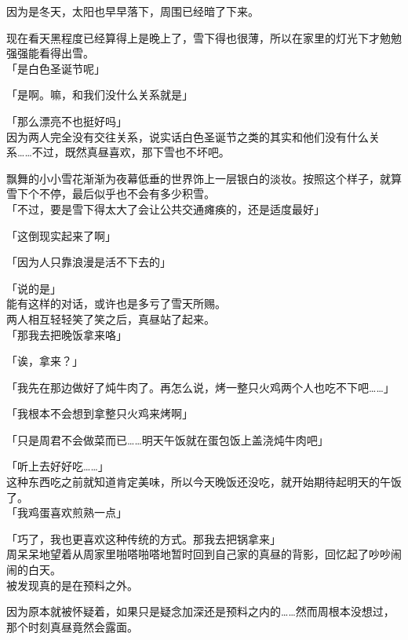 因为是冬天，太阳也早早落下，周围已经暗了下来。

现在看天黑程度已经算得上是晚上了，雪下得也很薄，所以在家里的灯光下才勉勉强强能看得出雪。\\

「是白色圣诞节呢」

「是啊。嘛，和我们没什么关系就是」

「那么漂亮不也挺好吗」\\

因为两人完全没有交往关系，说实话白色圣诞节之类的其实和他们没有什么关系……不过，既然真昼喜欢，那下雪也不坏吧。

飘舞的小小雪花渐渐为夜幕低垂的世界饰上一层银白的淡妆。按照这个样子，就算雪下个不停，最后似乎也不会有多少积雪。\\

「不过，要是雪下得太大了会让公共交通瘫痪的，还是适度最好」

「这倒现实起来了啊」

「因为人只靠浪漫是活不下去的」

「说的是」\\

能有这样的对话，或许也是多亏了雪天所赐。\\

两人相互轻轻笑了笑之后，真昼站了起来。\\

「那我去把晚饭拿来咯」

「诶，拿来？」

「我先在那边做好了炖牛肉了。再怎么说，烤一整只火鸡两个人也吃不下吧……」

「我根本不会想到拿整只火鸡来烤啊」

「只是周君不会做菜而已……明天午饭就在蛋包饭上盖浇炖牛肉吧」

「听上去好好吃……」\\

这种东西吃之前就知道肯定美味，所以今天晚饭还没吃，就开始期待起明天的午饭了。\\

「我鸡蛋喜欢煎熟一点」

「巧了，我也更喜欢这种传统的方式。那我去把锅拿来」\\

周呆呆地望着从周家里啪嗒啪嗒地暂时回到自己家的真昼的背影，回忆起了吵吵闹闹的白天。\\

被发现真的是在预料之外。

因为原本就被怀疑着，如果只是疑念加深还是预料之内的……然而周根本没想过，那个时刻真昼竟然会露面。\\

